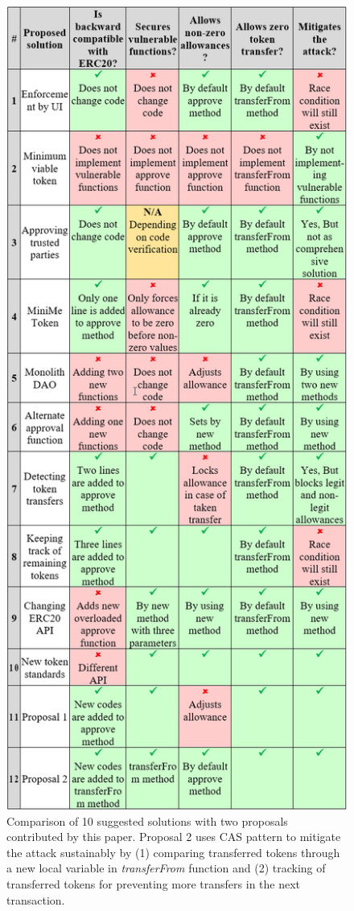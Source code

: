 \begin{figure}[H]
	\centering
	\includegraphics[width=1.0\linewidth]{figures/multiple_withdrawal_04.png}
	\caption{Comparison of 10 suggested solutions with two proposals contributed by this paper. Proposal 2 uses CAS pattern to mitigate the attack sustainably by (1) comparing transferred tokens through a new local variable in \textit{transferFrom} function and (2) tracking of transferred tokens for preventing more transfers in the next transaction.}
\end{figure}